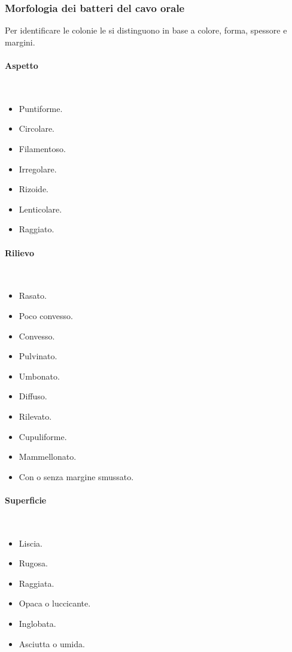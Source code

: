 		\subsubsection{Morfologia dei batteri del cavo orale}
		Per identificare le colonie le si distinguono in base a colore, forma, spessore e margini.

			\paragraph{Aspetto}\mbox{}\\
			\begin{multicols}{3}
				\begin{itemize}
					\item Puntiforme.
					\item Circolare.
					\item Filamentoso.
					\item Irregolare.
					\item Rizoide.
					\item Lenticolare.
					\item Raggiato.
				\end{itemize}
			\end{multicols}

			\paragraph{Rilievo}\mbox{}\\
			\begin{multicols}{2}
				\begin{itemize}
					\item Rasato.
					\item Poco convesso.
					\item Convesso.
					\item Pulvinato.
					\item Umbonato.
					\item Diffuso.
					\item Rilevato.
					\item Cupuliforme.
					\item Mammellonato.
					\item Con o senza margine smussato.
				\end{itemize}
			\end{multicols}

			\paragraph{Superficie}\mbox{}\\
			\begin{multicols}{3}
				\begin{itemize}
					\item Liscia.
					\item Rugosa.
					\item Raggiata.
					\item Opaca o luccicante.
					\item Inglobata.
					\item Asciutta o umida.
				\end{itemize}
			\end{multicols}
			

